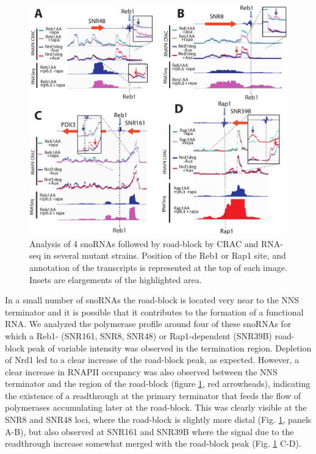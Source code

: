 \begin{figure}[h]

\centering
\includegraphics[width=\textwidth]{figures/results/rap/seven.pdf}
\caption[Analysis of 4 snoRNAs followed by road-block by CRAC and RNA-seq in several mutant strains.]{Analysis of 4 snoRNAs followed by road-block by CRAC and RNA-seq in several mutant strains. Position of the Reb1 or Rap1 site, and annotation of the transcripts is represented at the top of each image. Insets are elargements of the highlighted area.}
\label{fig:seven}

\end{figure}

In a small number of snoRNAs the road-block is located very near to the NNS terminator and it is possible that it contributes to the formation of a functional RNA. We analyzed the polymerase profile around four of these snoRNAs for which a Reb1- (SNR161, SNR8, SNR48) or Rap1-dependent (SNR39B) road-block peak of variable intensity was observed in the termination region. Depletion of Nrd1 led to a clear increase of the road-block peak, as expected. However, a clear increase in RNAPII occupancy was also observed between the NNS terminator and the region of the road-block (figure \ref{fig:seven}, red arrowheads), indicating the existence of a readthrough at the primary terminator that feeds the flow of polymerases accumulating later at the road-block. This was clearly visible at the SNR8 and SNR48 loci, where the road-block is slightly more distal (Fig. \ref{fig:seven}, panels A-B), but also observed at SNR161 and SNR39B where the signal due to the readthrough increase somewhat merged with the road-block peak (Fig. \ref{fig:seven} C-D).



